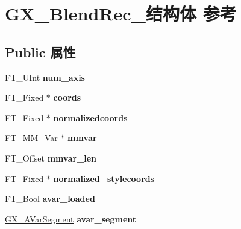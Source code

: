 \hypertarget{struct_g_x___blend_rec__}{}\section{G\+X\+\_\+\+Blend\+Rec\+\_\+结构体 参考}
\label{struct_g_x___blend_rec__}
\subsection*{Public 属性}
\begin{DoxyCompactItemize}
\item 
\mbox{\label{struct_g_x___blend_rec___a70b3b03355ad308ddd63e9555e8acd0e}} 
F\+T\+\_\+\+U\+Int {\bfseries num\+\_\+axis}
\item 
\mbox{\label{struct_g_x___blend_rec___acb4a71b31563b2a3cd0bacdf2ef88848}} 
F\+T\+\_\+\+Fixed $\ast$ {\bfseries coords}
\item 
\mbox{\label{struct_g_x___blend_rec___a292b7cea3a7e027858f3c27f05d59270}} 
F\+T\+\_\+\+Fixed $\ast$ {\bfseries normalizedcoords}
\item 
\mbox{\label{struct_g_x___blend_rec___a770f7d3eae9c396dfe6bbc8c8286e00f}} 
\hyperlink{struct_f_t___m_m___var__}{F\+T\+\_\+\+M\+M\+\_\+\+Var} $\ast$ {\bfseries mmvar}
\item 
\mbox{\label{struct_g_x___blend_rec___ae901170359808991f7d753551868066d}} 
F\+T\+\_\+\+Offset {\bfseries mmvar\+\_\+len}
\item 
\mbox{\label{struct_g_x___blend_rec___ad2bf71f05a071c1fc0259ade113415f7}} 
F\+T\+\_\+\+Fixed $\ast$ {\bfseries normalized\+\_\+stylecoords}
\item 
\mbox{\label{struct_g_x___blend_rec___a340ae3364b6068c986f14b9e5bde4072}} 
F\+T\+\_\+\+Bool {\bfseries avar\+\_\+loaded}
\item 
\mbox{\label{struct_g_x___blend_rec___a9622ddcd5f674632c5e53628e13875d0}} 
\hyperlink{struct_g_x___a_var_segment_rec__}{G\+X\+\_\+\+A\+Var\+Segment} {\bfseries avar\+\_\+segment}

\end{DoxyCompactItemize}
